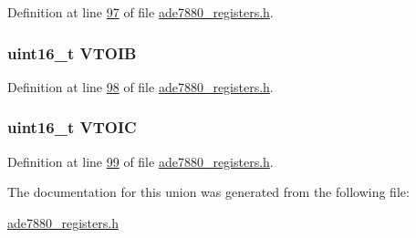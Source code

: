 Definition at line \hyperlink{a00036_source_l00097}{97} of file \hyperlink{a00036_source}{ade7880\-\_\-registers.\-h}.

\hypertarget{a00024_acfbe9cde66e39cf6b586d235b1c22a39}{
\subsubsection[{V\-T\-O\-I\-B}]{\setlength{\rightskip}{0pt plus 5cm}uint16\-\_\-t V\-T\-O\-I\-B}}\label{dc/de2/a00024_acfbe9cde66e39cf6b586d235b1c22a39}


Definition at line \hyperlink{a00036_source_l00098}{98} of file \hyperlink{a00036_source}{ade7880\-\_\-registers.\-h}.

\hypertarget{a00024_a8d61be8a876c755db7ca7fb46404777b}{
\subsubsection[{V\-T\-O\-I\-C}]{\setlength{\rightskip}{0pt plus 5cm}uint16\-\_\-t V\-T\-O\-I\-C}}\label{dc/de2/a00024_a8d61be8a876c755db7ca7fb46404777b}


Definition at line \hyperlink{a00036_source_l00099}{99} of file \hyperlink{a00036_source}{ade7880\-\_\-registers.\-h}.



The documentation for this union was generated from the following file\-:\begin{DoxyCompactItemize}
\item 
\hyperlink{a00036}{ade7880\-\_\-registers.\-h}\end{DoxyCompactItemize}
